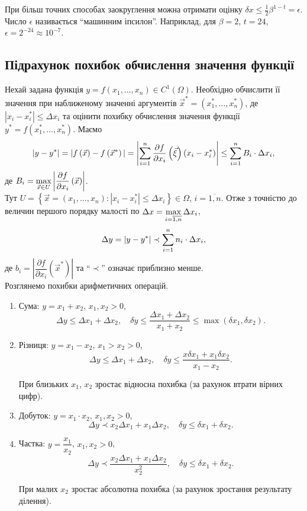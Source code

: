 При більш точних способах заокруглення можна отримати оцінку $\delta x \le \frac12 \beta^{1-t} = \epsilon$. Число $\epsilon$ називається ``машинним іпсилон''. Наприклад, для $\beta = 2$, $t = 24$, $\epsilon = 2^{-24} \approx 10^{-7}$.

\subsection{Підрахунок похибок обчислення значення функції}

Нехай задана функція $y = f(x_1, \ldots, x_n) \in C^1(\Omega)$. Необхідно обчислити її значення при наближеному значенні аргументів $\vec x^* = (x_1^*, \ldots, x_n^*)$, де $|x_i - x_i^*| \le \Delta x_i$ та оцінити похибку обчислення значення функції $y^* = f(x_1^*, \ldots, x_n^*)$. Маємо 
\[ |y-y^*| = |f\left(\vec x\right) - f\left(\vec x^*\right)| = \left| \displaystyle\sum\limits_{i=1}^n \dfrac{\partial f}{\partial x_i} \left(\vec \xi\right) (x_i - x_i^*) \right| \le \displaystyle\sum\limits_{i=1}^n B_i \cdot \Delta x_i, \] 
де $B_i = \displaystyle\max\limits_{\vec x \in U} \left| \dfrac{\partial f}{\partial x_i}\left(\vec x\right) \right|$. \\

Тут $U = \left\{ \vec x = (x_1, \ldots, x_n): |x_i - x_i^*| \le \Delta x_i\right\} \in \Omega$, $i=\overline{1,n}$. Отже з точністю до величин першого порядку малості по $\Delta x = \displaystyle\max\limits_{i=\overline{1,n}} \Delta x_i$, 
\[ \Delta y = |y - y^*| \prec \displaystyle\sum\limits_{i=1}^n n_i \cdot \Delta x_i,\]
де $b_i = \left| \dfrac{\partial f}{\partial x_i}\left(\vec x^*\right) \right|$ та ``$\prec$'' означає приблизно менше. \\

Розглянемо похибки арифметичних операцій.
\begin{enumerate}
	\item Сума: $y = x_1 + x_2$, $x_1, x_2 > 0$, 
	\[ \Delta y \le \Delta x_1 + \Delta x_2, \quad \delta y \le \dfrac{\Delta x_1 + \Delta x_2}{x_1 + x_2} \le \max(\delta x_1, \delta x_2). \] 
	
	\item Різниця: $y = x_1 - x_2$, $x_1 > x_2 > 0$,
	\[ \Delta y \le \Delta x_1 + \Delta x_2, \quad \delta y \le \dfrac{x \delta x_1 + x_1 \delta x_2}{x_1 - x_2}. \]
	
	При близьких $x_1$, $x_2$ зростає відносна похибка (за рахунок втрати вірних цифр).

	\item Добуток: $y = x_1 \cdot x_2$, $x_1, x_2 > 0$,
	\[ \Delta y \prec x_2 \Delta x_1 + x_1 \Delta x_2, \quad \delta y \le \delta x_1 + \delta x_2. \]

	\item Частка: $y = \dfrac{x_1}{x_2}$, $x_1, x_2 > 0$,
	\[ \Delta y \prec \dfrac{x_2 \Delta x_1 + x_1 \Delta x_2}{x_2^2}, \quad \delta y \le \delta x_1 + \delta x_2. \]

	При малих $x_2$ зростає абсолютна похибка (за рахунок зростання результату ділення). 
\end{enumerate}

